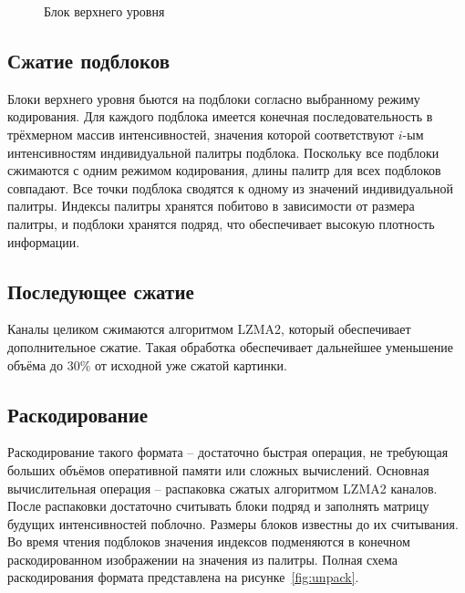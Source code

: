 \documentclass[a4paper,12pt]{article}
\numberwithin{equation}{section}
\begin{document}
\begin{figure}[t]
  \centering
  
  \caption{Блок верхнего уровня}
  \label{fig:block}
\end{figure}

\subsection{Сжатие подблоков}

Блоки верхнего уровня бьются на подблоки согласно выбранному режиму
кодирования. Для каждого подблока имеется конечная последовательность в
трёхмерном массив интенсивностей, значения которой соответствуют $i$-ым
интенсивностям индивидуальной палитры подблока. Поскольку все подблоки сжимаются
с одним режимом кодирования, длины палитр для всех подблоков совпадают. Все
точки подблока сводятся к одному из значений индивидуальной палитры. Индексы
палитры хранятся побитово в зависимости от размера палитры, и подблоки хранятся
подряд, что обеспечивает высокую плотность информации.

\subsection{Последующее сжатие}

Каналы целиком сжимаются алгоритмом LZMA2, который обеспечивает дополнительное
сжатие. Такая обработка обеспечивает дальнейшее уменьшение объёма до 30\% от
исходной уже сжатой картинки.

\subsection{Раскодирование}

Раскодирование такого формата -- достаточно быстрая операция, не требующая
больших объёмов оперативной памяти или сложных вычислений. Основная
вычислительная операция -- распаковка сжатых алгоритмом LZMA2 каналов. После
распаковки достаточно считывать блоки подряд и заполнять матрицу будущих
интенсивностей поблочно. Размеры блоков известны до их считывания. Во время
чтения подблоков значения индексов подменяются в конечном раскодированном
изображении на значения из палитры. Полная схема раскодирования формата
представлена на рисунке~\ref{fig:unpack}.
\end{document}
